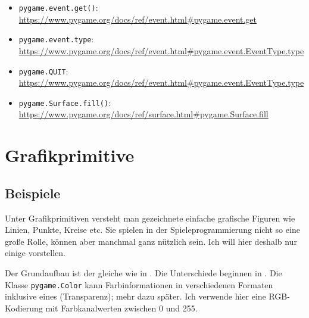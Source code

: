 \begin{itemize}
\item \texttt{pygame.event.get()}:
\\
\url{https://www.pygame.org/docs/ref/event.html#pygame.event.get}

\item \texttt{pygame.event.type}:
\\
\url{https://www.pygame.org/docs/ref/event.html#pygame.event.EventType.type}

\item \texttt{pygame.QUIT}:
\\
\url{https://www.pygame.org/docs/ref/event.html#pygame.event.EventType.type}

\item \texttt{pygame.Surface.fill()}:
\\
\url{https://www.pygame.org/docs/ref/surface.html#pygame.Surface.fill}
\end{itemize}

\chapter{Grafikprimitive}

\section{Beispiele}

Unter Grafikprimitiven versteht man gezeichnete einfache grafische Figuren wie Linien, Punkte, Kreise etc. Sie spielen in der Spieleprogrammierung nicht so eine große Rolle, können aber manchmal ganz nützlich sein. Ich will hier deshalb nur einige vorstellen. 




Der Grundaufbau ist der gleiche wie in . Die Unterschiede beginnen in . Die Klasse \texttt{pygame.Color} kann Farbinformationen in verschiedenen Formaten inklusive eines  (Transparenz); mehr dazu später. Ich verwende hier eine RGB-Kodierung mit Farbkanalwerten zwischen 0 und 255. 


